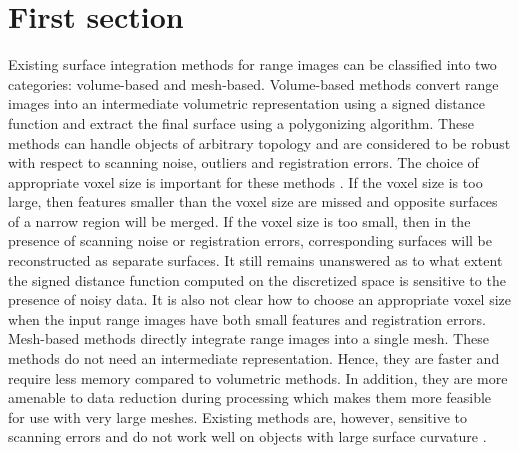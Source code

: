 
\section{First section}
Existing surface integration methods for range images can be classified into two categories: volume-based and mesh-based. Volume-based methods \cite{Claes:VolM05,Curless:VolM96,Masuda:VolM02,Hoppe:VolM97,Sato:VolM97,Sun:VolM03} convert range images into an intermediate volumetric representation using a signed distance function and extract the final surface using a polygonizing algorithm. These methods can handle objects of arbitrary topology and are considered to be robust with respect to scanning noise, outliers and registration errors. The choice of appropriate voxel size is important for these methods \cite{Claes:VolM05,Curless:VolM96}. If the voxel size is too large, then features smaller than the voxel size are missed and opposite surfaces of a narrow region will be merged. If the voxel size is too small, then in the presence of scanning noise or registration errors, corresponding surfaces will be reconstructed as separate surfaces. It still remains unanswered as to what extent the signed distance function computed on the discretized space is sensitive to the presence of noisy data. It is also not clear how to choose an appropriate voxel size when the input range images have both small features and registration errors. \\

Mesh-based methods \cite{Pito:MeshM96,Rutishauser:MeshM94,Sappa:MeshM00,Soucy:MeshM92,Soucy:MeshM95,Sun:MeshM00,Turk:MeshM94,Zhou:MeshM06} directly integrate range images into a single mesh. These methods do not need an intermediate representation. Hence, they are faster and require less memory compared to volumetric methods. In addition, they are more amenable to data reduction during processing which makes them more feasible for use with very large meshes. Existing methods are, however, sensitive to scanning errors and do not work well on objects with large surface curvature \cite{Curless:VolM96}.




